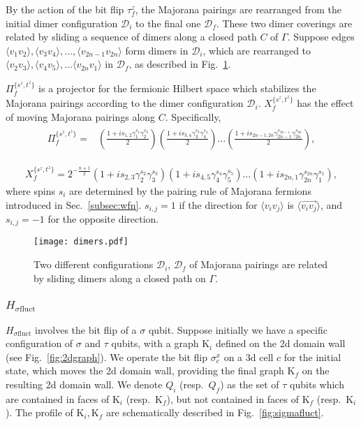 \documentclass[12pt]{article}
\numberwithin{equation}{section}
\begin{document}
By the action of the bit flip $\tau^z_f$, the Majorana pairings are rearranged from the initial dimer configuration $\mathcal{D}_i$ to the final one $\mathcal{D}_f$. These two dimer coverings are related by sliding a sequence of dimers along a closed path $C$ of $\Gamma$. 
Suppose edges $\langle v_1v_2\rangle, \langle v_3v_4\rangle, \dots,\langle v_{2n-1}v_{2n}\rangle$ form dimers in $\mathcal{D}_i$, which are rearranged to $\langle v_2v_3\rangle, \langle v_4v_5\rangle, \dots\langle v_{2n}v_{1}\rangle$ in $\mathcal{D}_f$, as described in Fig.~\ref{fig:dimer}. 

$\Pi_f^{\{s^z,t^z\}}$ is a projector for the fermionic Hilbert space which stabilizes the Majorana pairings according to the dimer configuration $\mathcal{D}_i$.
$X_f^{\{s^z,t^z\}}$ has the effect of moving Majorana pairings along $C$. Specifically,
\begin{align}
\begin{split}
    \Pi_{f}^{\{s^z,t^z\}}=& \left(\frac{1+is_{1,2}\gamma_1^{s_1}\gamma_2^{s_2}}{2}\right)\left(\frac{1+is_{3,4}\gamma_3^{s_3}\gamma_4^{s_4}}{2}\right)\dots \left(\frac{1+is_{2n-1,2n}\gamma_{2n-1}^{s_{2n-1}}\gamma_{2n}^{s_{2n}}}{2}\right),
    \end{split}
    \label{eq:pif}
\end{align}

\begin{align}
    X_f^{\{s^z,t^z\}}=2^{-\frac{n+1}{2}}(1+is_{2,3}\gamma_2^{s_2}\gamma_3^{s_3})(1+is_{4,5}\gamma_4^{s_4}\gamma_5^{s_5})\dots(1+is_{2n,1}\gamma_{2n}^{s_{2n}}\gamma_1^{s_1}),
    \label{eq:xf}
\end{align}
where spins $s_i$ are determined by the pairing rule of Majorana fermions introduced in Sec.~\ref{subsec:wfn}. $s_{i,j}=1$ if the direction for $\langle v_iv_j\rangle$ is $\langle\overrightarrow{v_iv_j}\rangle$, and $s_{i,j}=-1$ for the opposite direction.

\begin{figure}[htb]
\centering
\texttt{[image: dimers.pdf]}
\caption{Two different configurations $\mathcal{D}_i$, $\mathcal{D}_f$ of Majorana pairings are related by sliding dimers along a closed path on $\Gamma$.}
\label{fig:dimer}
\end{figure}



\subsubsection{$H_{\sigma\mathrm{fluct}}$}
$H_{\sigma\mathrm{fluct}}$ involves the bit flip of a $\sigma$ qubit. Suppose initially we have a specific configuration of $\sigma$ and $\tau$ qubits, with a graph $\mathrm{K}_{i}$ defined on the 2d domain wall (see Fig.~\ref{fig:2dgraph}). 
We operate the bit flip $\sigma^x_c$ on a 3d cell $c$ for the initial state, which moves the 2d domain wall, providing the final graph $\mathrm{K}_{f}$ on the resulting 2d domain wall. 
We denote $Q_i$ (resp.~$Q_f$) as the set of $\tau$ qubits which are contained in faces of $\mathrm{K}_{i}$ (resp.~$\mathrm{K}_{f}$), but not contained in faces of $\mathrm{K}_{f}$ (resp.~$\mathrm{K}_{i}$). The profile of $\mathrm{K}_{i}, \mathrm{K}_{f}$ are schematically described in Fig.~\ref{fig:sigmafluct}.
\end{document}
